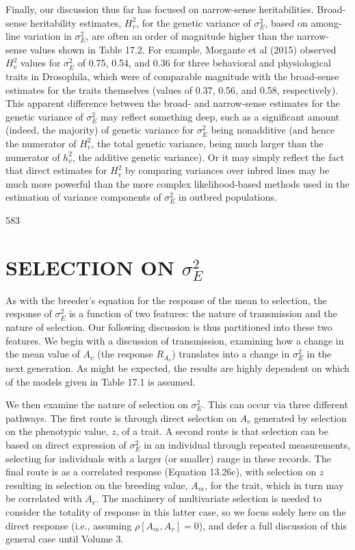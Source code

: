 \documentclass{article}
\begin{document}
Finally, our discussion thus far has focused on narrow-sense heritabilities. Broad-sense heritability estimates,  $ H_v^2 $, for the genetic variance of  $ \sigma_E^2 $, based on among-line variation in  $ \sigma_E^2 $, are often an order of magnitude higher than the narrow-sense values shown in Table 17.2. For example, Morgante et al (2015) observed  $ H_v^2 $ values for  $ \sigma_E^2 $ of 0.75, 0.54, and 0.36 for three behavioral and physiological traits in Drosophila, which were of comparable magnitude with the broad-sense estimates for the traits themselves (values of 0.37, 0.56, and 0.58, respectively). This apparent difference between the broad- and narrow-sense estimates for the genetic variance of  $ \sigma_E^2 $ may reflect something deep, such as a significant amount (indeed, the majority) of genetic variance for  $ \sigma_E^2 $ being nonadditive (and hence the numerator of  $ H_v^2 $, the total genetic variance, being much larger than the numerator of  $ h_v^2 $, the additive genetic variance). Or it may simply reflect the fact that direct estimates for  $ H_v^2 $ by comparing variances over inbred lines may be much more powerful than the more complex likelihood-based methods used in the estimation of variance components of  $ \sigma_E^2 $ in outbred populations.

583

\section{SELECTION ON  $ \sigma_{E}^{2} $}
As with the breeder’s equation for the response of the mean to selection, the response of  $ \sigma_{E}^{2} $ is a function of two features: the nature of transmission and the nature of selection. Our following discussion is thus partitioned into these two features. We begin with a discussion of transmission, examining how a change in the mean value of  $ A_{v} $ (the response  $ R_{A_{v}} $) translates into a change in  $ \sigma_{E}^{2} $ in the next generation. As might be expected, the results are highly dependent on which of the models given in Table 17.1 is assumed.

We then examine the nature of selection on  $ \sigma_E^2 $. This can occur via three different pathways. The first route is through direct selection on  $ A_v $ generated by selection on the phenotypic value,  $ z $, of a trait. A second route is that selection can be based on direct expression of  $ \sigma_E^2 $ in an individual through repeated measurements, selecting for individuals with a larger (or smaller) range in these records. The final route is as a correlated response (Equation 13.26c), with selection on  $ z $ resulting in selection on the breeding value,  $ A_m $, for the trait, which in turn may be correlated with  $ A_v $. The machinery of multivariate selection is needed to consider the totality of response in this latter case, so we focus solely here on the direct response (i.e., assuming  $ \rho[A_m, A_v] = 0 $), and defer a full discussion of this general case until Volume 3.
\end{document}
